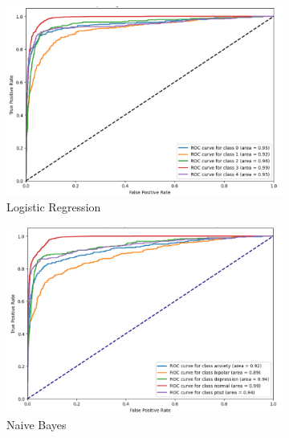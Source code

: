 \pagebreak

\begin{figure}[H]
    \centering
    \begin{subfigure}[b]{0.49\textwidth}
        \centering
        \includegraphics[width=\textwidth]{Images/LR ROC.png}
        \caption*{Logistic Regression}
        \label{LRROC}  %
    \end{subfigure}
    \hfill
    \vspace{0.75cm}
    \begin{subfigure}[b]{0.49\textwidth}
        \centering
        \includegraphics[width=\textwidth]{Images/NB ROC.png}
        \caption*{Naive Bayes}
        \label{NBROC}  %
    \end{subfigure}
    \hfill
    \begin{subfigure}[b]{0.49\textwidth}

\end{subfigure}
\end{figure}
